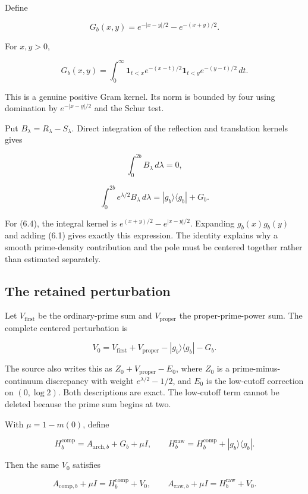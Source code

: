 \documentclass[
  10pt,
  a4paper,
  10pt,
  oneside,
  openany]{book}
\begin{document}
Define

\[
G_b(x,y)=e^{-|x-y|/2}-e^{-(x+y)/2}.
\tag{6.1}\label{eq:6.1}
\]

For \(x,y>0\),

\[
G_b(x,y)=\int_0^\infty
\mathbf1_{t<x}e^{-(x-t)/2}
\mathbf1_{t<y}e^{-(y-t)/2}\,dt.
\tag{6.2}\label{eq:6.2}
\]

This is a genuine positive Gram kernel. Its norm is bounded by four
using domination by \(e^{-|x-y|/2}\) and the Schur test.

Put \(B_\lambda=R_\lambda-S_\lambda\). Direct integration of the
reflection and translation kernels gives

\[
\int_0^{2b}B_\lambda\,d\lambda=0,
\tag{6.3}\label{eq:6.3}
\]

\[
\int_0^{2b}e^{\lambda/2}B_\lambda\,d\lambda
=|g_b\rangle\langle g_b|+G_b.
\tag{6.4}\label{eq:6.4}
\]

For (6.4), the integral kernel is \(e^{(x+y)/2}-e^{|x-y|/2}\). Expanding
\(g_b(x)g_b(y)\) and adding (6.1) gives exactly this expression. The
identity explains why a smooth prime-density contribution and the pole
must be centered together rather than estimated separately.

\subsection{The retained perturbation}\label{the-retained-perturbation}

Let \(V_{\mathrm{first}}\) be the ordinary-prime sum and
\(V_{\mathrm{proper}}\) the proper-prime-power sum. The complete
centered perturbation is

\[
V_0=V_{\mathrm{first}}+V_{\mathrm{proper}}
-|g_b\rangle\langle g_b|-G_b.
\tag{6.5}\label{eq:6.5}
\]

The source also writes this as \(Z_0+V_{\mathrm{proper}}-E_0\), where
\(Z_0\) is a prime-minus-continuum discrepancy with weight
\(e^{\lambda/2}-1/2\), and \(E_0\) is the low-cutoff correction on
\((0,\log2)\). Both descriptions are exact. The low-cutoff term cannot
be deleted because the prime sum begins at two.

With \(\mu=1-m(0)\), define

\[
H_b^{\mathrm{comp}}=A_{\mathrm{arch},b}+G_b+\mu I,
\qquad
H_b^{\mathrm{raw}}=H_b^{\mathrm{comp}}+|g_b\rangle\langle g_b|.
\tag{6.6}\label{eq:6.6}
\]

Then the same \(V_0\) satisfies

\[
A_{\mathrm{comp},b}+\mu I=H_b^{\mathrm{comp}}+V_0,
\qquad
A_{\mathrm{raw},b}+\mu I=H_b^{\mathrm{raw}}+V_0.
\tag{6.7}\label{eq:6.7}
\]
\end{document}
